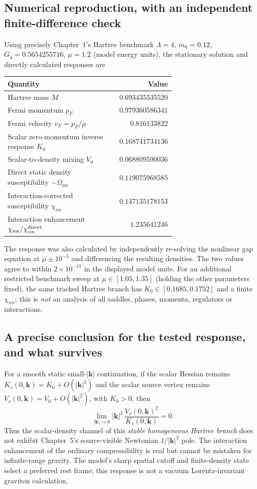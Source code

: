 \documentclass[11pt,a4paper]{article}
\theoremstyle{remark}\newtheorem{remark}[theorem]{Remark}
\begin{document}
\subsection{Numerical reproduction, with an independent finite-difference check}
Using precisely Chapter~1's Hartree benchmark $\Lambda=4$, $m_0=0.12$, $G_4=0.5654255716$, $\mu=1.2$ (model energy units), the stationary solution and directly calculated responses are
\begin{center}\small
\begin{tabular}{@{}p{0.65\linewidth}r@{}}\toprule
Quantity & Value\\\midrule
Hartree mass $M$ & $0.693435535520$\\
Fermi momentum $p_F$ & $0.979360586341$\\
Fermi velocity $v_F=p_F/\mu$ & $0.816133822$\\
Scalar zero-momentum inverse response $K_0$ & $0.168741734136$\\
Scalar-to-density mixing $V_0$ & $0.068809590036$\\
Direct static density susceptibility $-\Omega_{\mu\mu}$ & $0.119075968585$\\
Interaction-corrected susceptibility $\chi_{nn}$ & $0.147135178153$\\
Interaction enhancement $\chi_{nn}/\chi_{nn}^{\rm direct}$ & $1.235641246$\\\bottomrule
\end{tabular}
\end{center}
The response was also calculated by independently re-solving the nonlinear gap equation at $\mu\pm10^{-5}$ and differencing the resulting densities. The two values agree to within $2\times10^{-11}$ in the displayed model units. For an additional restricted benchmark sweep at $\mu\in[1.05,1.35]$ (holding the other parameters fixed), the same tracked Hartree branch has $K_0\in[0.1685,0.1752]$ and a finite $\chi_{nn}$; this is \emph{not} an analysis of all saddles, phases, momenta, regulators or interactions.

\subsection{A precise conclusion for the tested response, and what survives}
For a smooth static small-$|\bm k|$ continuation, if the scalar Hessian remains $K_s(0,\bm k)=K_0+O(|\bm k|^2)$ and the scalar source vertex remains $V_s(0,\bm k)=V_0+O(|\bm k|^2)$, with $K_0>0$, then
\begin{equation}\label{eq:v23-nopole}
\boxed{\lim_{|\bm k|\to0}|\bm k|^2\,\frac{V_s(0,\bm k)^2}{K_s(0,\bm k)}=0.}
\end{equation}
Thus the scalar-density channel of this \emph{stable homogeneous Hartree branch} does not exhibit Chapter~5's source-visible Newtonian $1/|\bm k|^2$ pole. The interaction enhancement of the ordinary compressibility is real but cannot be mistaken for infinite-range gravity. The model's sharp spatial cutoff and finite-density state select a preferred rest frame; this response is not a vacuum Lorentz-invariant graviton calculation.
\end{document}
